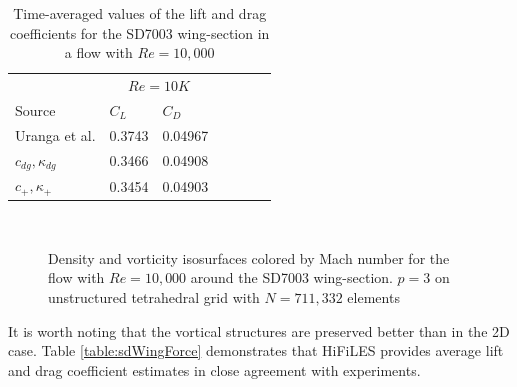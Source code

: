 \begin{table}[htbp]
\centering
\begin{tabular}{ l| l l| l l| l l} 
  
 &  \multicolumn{2}{|c|}{$Re = 10K$}  \\ 
 Source & $C_L$ & $C_D$    \\ 
\hline
 Uranga et al.\cite{uranga2011implicit} & 0.3743 & 0.04967   \\ 
$c_{dg},\kappa_{dg}$ & 0.3466 & 0.04908  \\ 
$c_{+},\kappa_{+}$ & 0.3454 & 0.04903 \\ 
 \end{tabular}
\caption{Time-averaged values of the lift and drag coefficients for the SD7003 wing-section in a flow with $Re = 10,000$}
\label{table:sdWingForce} 
 \end{table}


\begin{figure}[htbp]
\centering
{}
\\

\caption{Density and vorticity isosurfaces colored by Mach number for the flow with $Re = 10,000$ around the SD7003 wing-section. $p=3$ on unstructured tetrahedral grid with $N = 711,332$ elements}
\label{sdwingre10k}
\end{figure}

It is worth noting that the vortical structures are preserved better than in the 2D case. Table \eqref{table:sdWingForce} demonstrates that HiFiLES provides average lift and drag coefficient estimates in close agreement with experiments.

